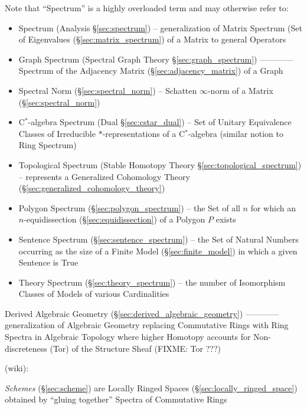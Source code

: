 \fist Note that ``Spectrum'' is a highly overloaded term and may otherwise
refer to:
\begin{itemize}
  \item Spectrum (Analysis \S\ref{sec:spectrum}) -- generalization of Matrix
    Spectrum (Set of Eigenvalues (\S\ref{sec:matrix_spectrum}) of a Matrix to
    general Operators

  \item Graph Spectrum (Spectral Graph Theory \S\ref{sec:graph_spectrum}) ------------
    Spectrum of the Adjacency Matrix (\S\ref{sec:adjacency_matrix}) of a Graph

  \item Spectral Norm (\S\ref{sec:spectral_norm}) -- Schatten $\infty$-norm of
    a Matrix (\S\ref{sec:spectral_norm})

  \item C$^*$-algebra Spectrum (Dual \S\ref{sec:cstar_dual}) -- Set of Unitary
    Equivalence Classes of Irreducible $*$-representations of a C$^*$-algebra
    (similar notion to Ring Spectrum)

  \item Topological Spectrum (Stable Homotopy Theory
    \S\ref{sec:topological_spectrum}) -- represents a Generalized Cohomology
    Theory (\S\ref{sec:generalized_cohomology_theory})

  \item Polygon Spectrum (\S\ref{sec:polygon_spectrum}) -- the Set of all $n$
    for which an $n$-equidissection (\S\ref{sec:equidissection}) of a Polygon
    $P$ exists

  \item Sentence Spectrum (\S\ref{sec:sentence_spectrum}) -- the Set of Natural
    Numbers occurring as the size of a Finite Model (\S\ref{sec:finite_model})
    in which a given Sentence is True
  \item Theory Spectrum (\S\ref{sec:theory_spectrum}) -- the number of
    Isomorphism Classes of Models of various Cardinalities
\end{itemize}

\fist Derived Algebraic Geometry (\S\ref{sec:derived_algebraic_geometry}) ------------
generalization of Algebraic Geometry replacing Commutative Rings with Ring
Spectra in Algebraic Topology where higher Homotopy accounts for
Non-discreteness (Tor) of the Structure Sheaf (FIXME: Tor ???)

(wiki):

\fist \emph{Schemes} (\S\ref{sec:scheme}) are Locally Ringed Spaces
(\S\ref{sec:locally_ringed_space}) obtained by ``gluing together'' Spectra of
Commutative Rings


